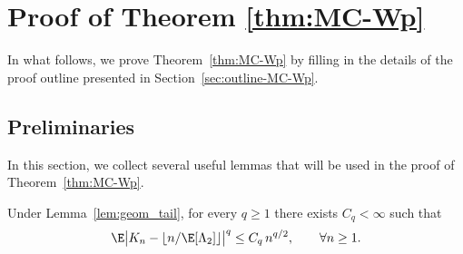 \documentclass[mnsc,nonblindrev]{informs3}
\begin{document}
\section{Proof of Theorem \ref{thm:MC-Wp}}\label{sec:proof-MC-Wp}
In what follows, we prove Theorem~\ref{thm:MC-Wp} by filling in the details of the proof outline
presented in Section~\ref{sec:outline-MC-Wp}.


\subsection{Preliminaries}
In this section, we collect several useful lemmas that will be used in the proof of Theorem~\ref{thm:MC-Wp}.
\begin{lemma}\label{lem:K}
Under Lemma~\ref{lem:geom_tail}, for every \(q\ge 1\) there exists
\(C_q<\infty\) such that
\[
\E\bigl|K_n-\lfloor n/\E[\Lambda_2] \rfloor\bigr|^{q}
\le C_q\, n^{q/2},
\qquad \forall n\ge 1.
\]
\end{lemma}
\end{document}
